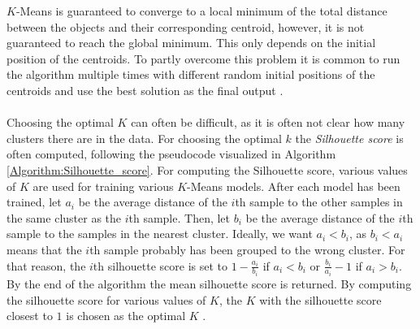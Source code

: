 \documentclass[./main.tex]{subfiles}
\begin{document}
$K$-Means is guaranteed to converge to a local minimum of the total distance between the objects and their corresponding centroid, however, it is not guaranteed to reach the global minimum. This only depends on the initial position of the centroids. To partly overcome this problem it is common to run the algorithm multiple times with different random initial positions of the centroids and use the best solution as the final output \cite{MAD_book}.
\\
\\
Choosing the optimal $K$ can often be difficult, as it is often not clear how many clusters there are in the data. For choosing the optimal $k$ the \textit{Silhouette score} is often computed, following the pseudocode visualized in Algorithm \ref{Algorithm:Silhouette_score}. For computing the Silhouette score, various values of $K$ are used for training various $K$-Means models. After each model has been trained, let $a_i$ be the average distance of the $i$th sample to the other samples in the same cluster as the $i$th sample. Then, let $b_i$ be the average distance of the $i$th sample to the samples in the nearest cluster. Ideally, we want $a_i < b_i$, as $b_i < a_i$ means that the $i$th sample probably has been grouped to the wrong cluster. For that reason, the $i$th silhouette score is set to $1 - \frac{a_i}{b_i}$ if $a_i < b_i$ or $\frac{b_i}{a_i} - 1$ if $a_i > b_i$. By the end of the algorithm the mean silhouette score is returned. By computing the silhouette score for various values of $K$, the $K$ with the silhouette score closest to $1$ is chosen as the optimal $K$ \cite{MAD_L12}.
\end{document}
